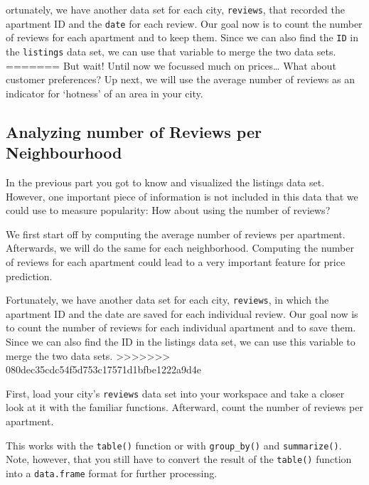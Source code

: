 \documentclass[
  11pt,
]{article}
\newenvironment{tips}[1]
  {
  \begin{itemize}
  \footnotesize
  \renewcommand{\labelitemi}{
    \raisebox{-.7\height}[0pt][0pt]{
      {\setkeys{Gin}{width=3em,keepaspectratio}
        \texttt{[image: images/\#1.png]}}
    }
  }
  \setlength{\fboxsep}{1em}
  \begin{rbox}
  \item
  }
  {
  \end{rbox}
  \end{itemize}
  }
\begin{document}
\begin{tips}
Fortunately, we have another data set for each city, \texttt{reviews}, that recorded the apartment ID and the \texttt{date} for each review.
Our goal now is to count the number of reviews for each apartment and to keep them.
Since we can also find the \texttt{ID} in the \texttt{listings} data set, we can use that variable to merge the two data sets.
=======
But wait! Until now we focussed much on prices\ldots{} What about customer preferences? Up next, we will use the average number of reviews as an indicator for `hotness' of an area in your city.

\hypertarget{analyzing-number-of-reviews-per-neighbourhood}{%
\subsection{Analyzing number of Reviews per Neighbourhood}\label{analyzing-number-of-reviews-per-neighbourhood}}

In the previous part you got to know and visualized the listings data set. However, one important piece of information is not included in this data that we could use to measure popularity: How about using the number of reviews?

We first start off by computing the average number of reviews per apartment. Afterwards, we will do the same for each neighborhood. Computing the number of reviews for each apartment could lead to a very important feature for price prediction.

Fortunately, we have another data set for each city, \texttt{reviews}, in which the apartment ID and the date are saved for each individual review. Our goal now is to count the number of reviews for each individual apartment and to save them. Since we can also find the ID in the listings data set, we can use this variable to merge the two data sets.
>>>>>>> 080dec35cdc54f5d753c17571d1bfbe1222a9d4e

First, load your city's \texttt{reviews} data set into your workspace and take a closer look at it with the familiar functions.
Afterward, count the number of reviews per apartment.

\begin{tips}r
This works with the \texttt{table()} function or with \texttt{group\_by()} and \texttt{summarize()}.
Note, however, that you still have to convert the result of the \texttt{table()} function into a \texttt{data.frame} format for further processing.

\end{tips}


\end{tips}
\end{document}
